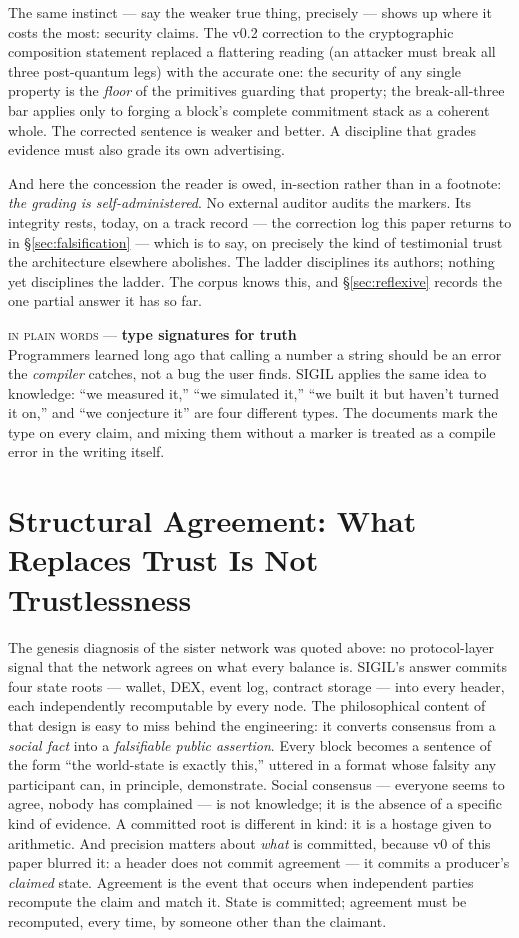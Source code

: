 \documentclass[10pt,a4paper]{article}
\newcommand{\layman}[3]{%
\begin{tcolorbox}[enhanced,
  interior style={left color=#1!9,right color=white},
  colframe=#1!45!slate,boxrule=0.5pt,arc=3pt,
  borderline west={2.5pt}{0pt}{#1},
  left=9pt,right=9pt,top=7pt,bottom=7pt]
{\scriptsize\textcolor{#1}{\textsc{in plain words}}\; — \;\textbf{\small #2}}\\[3pt]
\small #3
\end{tcolorbox}}
\begin{document}
The same instinct — say the weaker true thing, precisely — shows up where it costs
the most: security claims. The v0.2 correction to the cryptographic composition
statement replaced a flattering reading (an attacker must break all three
post-quantum legs) with the accurate one: the security of any single property is the
\emph{floor} of the primitives guarding that property; the break-all-three bar
applies only to forging a block's complete commitment stack as a coherent whole.
The corrected sentence is weaker and better. A discipline that grades evidence must
also grade its own advertising.

And here the concession the reader is owed, in-section rather than in a footnote:
\emph{the grading is self-administered}. No external auditor audits the markers. Its
integrity rests, today, on a track record — the correction log this paper returns to
in \S\ref{sec:falsification} — which is to say, on precisely the kind of
testimonial trust the architecture elsewhere abolishes. The ladder disciplines its
authors; nothing yet disciplines the ladder. The corpus knows this, and
\S\ref{sec:reflexive} records the one partial answer it has so far.

\layman{sigilviolet}{type signatures for truth}{Programmers learned long ago that
calling a number a string should be an error the \emph{compiler} catches, not a bug
the user finds. SIGIL applies the same idea to knowledge: ``we measured it,'' ``we
simulated it,'' ``we built it but haven't turned it on,'' and ``we conjecture it''
are four different types. The documents mark the type on every claim, and mixing
them without a marker is treated as a compile error in the writing itself.}

\section{Structural Agreement: What Replaces Trust Is Not Trustlessness}\label{sec:structural}

The genesis diagnosis of the sister network was quoted above: no protocol-layer
signal that the network agrees on what every balance is. SIGIL's answer commits four
state roots — wallet, DEX, event log, contract storage — into every header, each
independently recomputable by every node. The philosophical content of that design
is easy to miss behind the engineering: it converts consensus from a \emph{social
fact} into a \emph{falsifiable public assertion}. Every block becomes a sentence of
the form ``the world-state is exactly this,'' uttered in a format whose falsity any
participant can, in principle, demonstrate. Social consensus — everyone seems to
agree, nobody has complained — is not knowledge; it is the absence of a specific
kind of evidence. A committed root is different in kind: it is a hostage given to
arithmetic. And precision matters about \emph{what} is committed, because v0 of
this paper blurred it: a header does not commit agreement — it commits a
producer's \emph{claimed} state. Agreement is the event that occurs when
independent parties recompute the claim and match it. State is committed;
agreement must be recomputed, every time, by someone other than the claimant.
\end{document}

